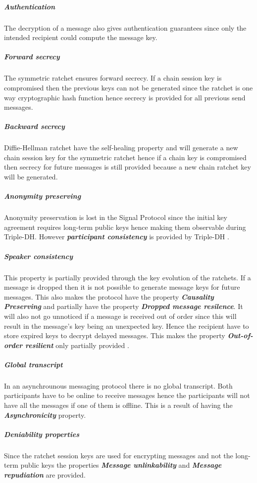 \subparagraph{Authentication} The decryption of a message also gives authentication guarantees since only the intended recipient could compute the message key.

\subparagraph{Forward secrecy} The symmetric ratchet ensures forward secrecy. If a chain session key is compromised then the previous keys can not be generated since the ratchet is one way cryptographic hash function hence secrecy is provided for all previous send messages.  

\subparagraph{Backward secrecy} Diffie-Hellman ratchet have the self-healing property and will generate a new chain session key for the symmetric ratchet hence if a chain key is compromised then secrecy for future messages is still provided because a new chain ratchet key will be generated.

\subparagraph{Anonymity preserving}

Anonymity preservation is lost in the Signal Protocol since the initial key agreement requires long-term public keys hence making them observable during Triple-DH. However \textbf{\emph{participant consistency}} is provided by Triple-DH \cite{sok}. %

\subparagraph{Speaker consistency}
This property is partially provided through the key evolution of the ratchets. If a message is dropped then it is not possible to generate message keys for future messages. This also makes the protocol have the property \textbf{\emph{Causality Preserving}} and partially have the property \emph{\textbf{Dropped message resilence}}. It will also not go unnoticed if a message is received out of order since this will result in the message's key being an unexpected key. Hence the recipient have to store expired keys to decrypt delayed messages. This makes the property \emph{\textbf{Out-of-order resilient}} only partially provided \cite{sok}.

\subparagraph{Global transcript} 
In an asynchrounous messaging protocol there is no global transcript. Both participants have to be online to receive messages hence the participants will not have all the messages if one of them is offline. This is a result of having the \textbf{\emph{Asynchronicity}} property.

\subparagraph{Deniability properties}

Since the ratchet session keys are used for encrypting messages and not the long-term public keys the properties \textbf{\emph{Message unlinkability}} and \textbf{\emph{Message repudiation}} are provided. 


